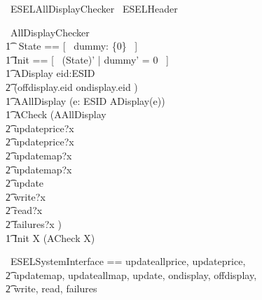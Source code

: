 \begin{zsection}
	\SECTION\ ESELAllDisplayChecker \parents\ ESELHeader
\end{zsection}

\begin{circus}
	\circprocess\ AllDisplayChecker \circdef \circbegin \\
        \t1 \circstate\ State == [~ dummy: \{0\} ~] \\
    	\t1	Init == [~ (State)' | dummy' = 0 ~] \\
        \t1 ADisplay \circdef eid:ESID \circspot \\
            \t2 (offdisplay.eid \then \Skip \extchoice ondisplay.eid \then \Skip) \\
        \t1 AAllDisplay \circdef (\Interleave e: ESID \circspot ADisplay(e)) \\
        \t1 ACheck \circdef (AAllDisplay \extchoice \\
            \t2 updateprice?x \then \Skip \extchoice \\
            \t2 updateprice?x \then \Skip \extchoice \\
            \t2 updatemap?x \then \Skip \extchoice \\
            \t2 updatemap?x \then \Skip \extchoice \\
            \t2 update \then \Skip \extchoice \\
            \t2 write?x \then \Skip \extchoice \\
            \t2 read?x \then \Skip \extchoice \\
            \t2 failures?x \then \Skip) \\ 
	    \t1 \circspot \lschexpract Init \rschexpract \circseq \circmu X \circspot (ACheck \circseq X) \\
	\circend
\end{circus}

\begin{circus}
   \circchannelset\ ESELSystemInterface == \lchanset updateallprice, updateprice, \\
    \t2 updatemap, updateallmap, update, ondisplay, offdisplay, \\
    \t2 write, read, failures \rchanset \\
\end{circus}
